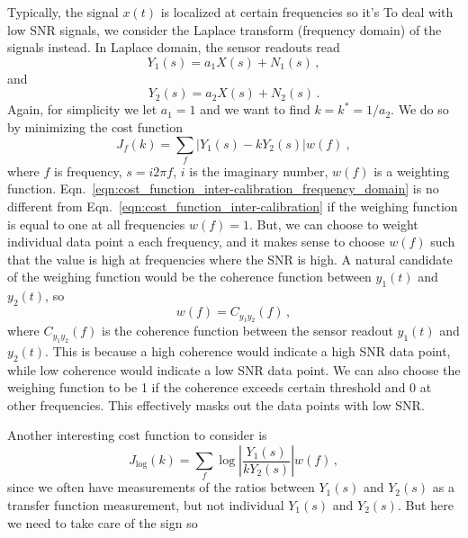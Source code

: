 Typically, the signal $x(t)$ is localized at certain frequencies so it's 
To deal with low SNR signals, we consider the Laplace transform (frequency domain) of the signals instead.
In Laplace domain, the sensor readouts read
\begin{equation}
	Y_1(s) = a_1X(s) + N_1(s)\,,
\end{equation}
and
\begin{equation}
	Y_2(s) = a_2X(s) + N_2(s)\,.
\end{equation}
Again, for simplicity we let $a_1 = 1$ and we want to find $k=k^*=1/a_2$.
We do so by minimizing the cost function
\begin{equation}
	\boxed{
		J_f (k) = \sum_{f} \left\lvert Y_1(s) - kY_2(s)\right\rvert w(f)
	}\ ,
	\label{eqn:cost_function_inter-calibration_frequency_domain}
\end{equation}
where $f$ is frequency, $s=i2\pi f$, $i$ is the imaginary number, $w(f)$ is a weighting function.
Eqn.~\eqref{eqn:cost_function_inter-calibration_frequency_domain} is no different from Eqn.~\eqref{eqn:cost_function_inter-calibration} if the weighing function is equal to one at all frequencies $w(f)=1$.
But, we can choose to weight individual data point a each frequency, and it makes sense to choose $w(f)$ such that the value is high at frequencies where the SNR is high.
A natural candidate of the weighing function would be the coherence function between $y_1(t)$ and $y_2(t)$, so
\begin{equation}
	\boxed{
		w(f) = C_{y_1y_2}(f)\,,
}
\end{equation}
 where $C_{y_1y_2}(f)$ is the coherence function between the sensor readout $y_1(t)$ and $y_2(t)$.
 This is because a high coherence would indicate a high SNR data point, while low coherence would indicate a low SNR data point.
 We can also choose the weighing function to be 1 if the coherence exceeds certain threshold and 0 at other frequencies.
 This effectively masks out the data points with low SNR.
 
Another interesting cost function to consider is
\begin{equation}
	J_\mathrm{log} (k) = \sum_f \log\left\lvert \frac{Y_1(s)}{kY_2(s)} \right\rvert w(f)\,,
\end{equation}
since we often have measurements of the ratios between $Y_1(s)$ and $Y_2(s)$ as a transfer function measurement, but not individual $Y_1(s)$ and $Y_2(s)$.
But here we need to take care of the sign so





